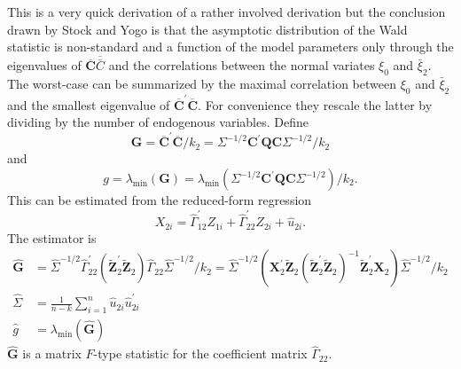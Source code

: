 \documentclass[10pt]{article}
\begin{document}
This is a very quick derivation of a rather involved derivation but the conclusion drawn by Stock and Yogo is that the asymptotic distribution of the Wald statistic is non-standard and a function of the model parameters only through the eigenvalues of $\overline{\boldsymbol{C}} \overline{\bar{C}}$ and the correlations between the normal variates $\xi_{0}$ and $\bar{\xi}_{2}$. The worst-case can be summarized by the maximal correlation between $\xi_{0}$ and $\bar{\xi}_{2}$ and the smallest eigenvalue of $\overline{\boldsymbol{C}}^{\prime} \overline{\boldsymbol{C}}$. For convenience they rescale the latter by dividing by the number of endogenous variables. Define
$$
\boldsymbol{G}=\overline{\boldsymbol{C}}^{\prime} \overline{\boldsymbol{C}} / k_{2}=\Sigma^{-1 / 2} \boldsymbol{C}^{\prime} \boldsymbol{Q} \boldsymbol{C} \Sigma^{-1 / 2} / k_{2}
$$
and
$$
g=\lambda_{\min }(\boldsymbol{G})=\lambda_{\min }\left(\Sigma^{-1 / 2} \boldsymbol{C}^{\prime} \boldsymbol{Q} \boldsymbol{C} \Sigma^{-1 / 2}\right) / k_{2} .
$$
This can be estimated from the reduced-form regression
$$
X_{2 i}=\widehat{\Gamma}_{12}^{\prime} Z_{1 i}+\widehat{\Gamma}_{22}^{\prime} Z_{2 i}+\widehat{u}_{2 i} .
$$
The estimator is
$$
\begin{aligned}
\widehat{\boldsymbol{G}} &=\widehat{\Sigma}^{-1 / 2} \widehat{\Gamma}_{22}^{\prime}\left(\widetilde{\boldsymbol{Z}}_{2}^{\prime} \widetilde{\boldsymbol{Z}}_{2}\right) \widehat{\Gamma}_{22} \widehat{\Sigma}^{-1 / 2} / k_{2}=\widehat{\Sigma}^{-1 / 2}\left(\boldsymbol{X}_{2}^{\prime} \widetilde{\boldsymbol{Z}}_{2}\left(\widetilde{\boldsymbol{Z}}_{2}^{\prime} \widetilde{\boldsymbol{Z}}_{2}\right)^{-1} \widetilde{\boldsymbol{Z}}_{2}^{\prime} \boldsymbol{X}_{2}\right) \widehat{\Sigma}^{-1 / 2} / k_{2} \\
\widehat{\Sigma} &=\frac{1}{n-k} \sum_{i=1}^{n} \widehat{u}_{2 i} \widehat{u}_{2 i}^{\prime} \\
\widehat{g} &=\lambda_{\min }(\widehat{\boldsymbol{G}})
\end{aligned}
$$
$\widehat{\boldsymbol{G}}$ is a matrix $F$-type statistic for the coefficient matrix $\widehat{\Gamma}_{22}$.
\end{document}
